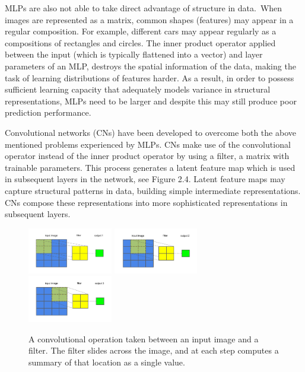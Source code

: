 \noindent MLPs are also not able to take direct advantage of structure in data.\ When images are represented as a matrix, common shapes (features) may appear in a regular composition. For example, different cars may appear regularly as a compositions of rectangles and circles. The inner product operator applied between the input (which is typically flattened into a vector) and layer parameters of an MLP, destroys the spatial information of the data, making the task of learning distributions of features harder. As a result, in order to possess sufficient learning capacity that adequately models variance in structural representations, MLPs need to be larger and despite this may still produce poor prediction performance. \par

\noindent Convolutional networks (CNs) have been developed to overcome both the above mentioned problems experienced by MLPs. CNs make use of the convolutional operator instead of the inner product operator by using a filter, a matrix with trainable parameters. This process generates a latent feature map which is used in subsequent layers in the network, see Figure 2.4. Latent feature maps may capture structural patterns in data, building simple intermediate representations. CNs compose these representations into more sophisticated representations in subsequent layers. \par 

\begin{figure}[H]
	\centering
	\includegraphics[width=0.33\textwidth, height=0.25\textwidth]{convolution1}\hfill
	\includegraphics[width=0.33\textwidth, height=0.25\textwidth]{convolution2}\hfill
	\includegraphics[width=0.33\textwidth, height=0.25\textwidth]{convolution3}
	\caption{A convolutional operation taken between an input image and a filter. The filter slides across the image, and at each step computes a summary of that location as a single value.}
\end{figure}

